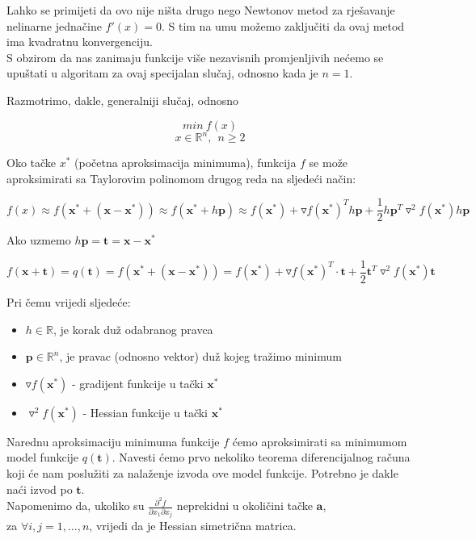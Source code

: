 \documentclass[bosnian,12pt,a4paper]{report}
\begin{document}
	\vspace{1cm}
	Lahko se primijeti da ovo nije ništa drugo nego Newtonov metod za rješavanje nelinarne jednačine $f'(x)=0$. S tim na umu možemo zaključiti da ovaj metod ima kvadratnu konvergenciju. \\ S obzirom da nas zanimaju funkcije više nezavisnih promjenljivih nećemo se upuštati u algoritam za ovaj specijalan slučaj, odnosno kada je $n=1$.
	
	\vspace{1.5cm}
	Razmotrimo, dakle, generalniji slučaj, odnosno
	
	$$min~f(x)$$
	$$x \in \mathbb{R}^n, ~~ n \geq 2$$
	
	\vspace{0.5cm}
	Oko tačke $x^{*}$ (početna aproksimacija minimuma), funkcija $f$ se može aproksimirati sa Taylorovim polinomom drugog reda na sljedeći način:
	
	$$f(x) \approx f(\textbf{x}^* + (\textbf{x} - \textbf{x}^*)) \approx f(\textbf{x}^* + h\textbf{p}) \approx f(\textbf{x}^*) + \triangledown f(\textbf{x}^*)^T h\textbf{p} + \frac{1}{2} h \textbf{p}^T \triangledown^2 f(\textbf{x}^*) h \textbf{p}$$
	
	Ako uzmemo $h\textbf{p} = \textbf{t}  = \textbf{x}-\textbf{x}^*$ 
	
	$$f(\textbf{x} + \textbf{t}) = q(\textbf{t}) = f(\textbf{x}^* + (\textbf{x} - \textbf{x}^*)) = f(\textbf{x}^*) + \triangledown f(\textbf{x}^*)^T \cdot\textbf{t} + \frac{1}{2} \textbf{t}^T \triangledown^2 f(\textbf{x}^*)\textbf{t}$$
	
	\newpage
	Pri čemu vrijedi sljedeće:
	
	\begin{itemize}
		\item $h \in \mathbb{R}$, je korak duž odabranog pravca
		\item $\textbf{p} \in \mathbb{R}^n$, je pravac (odnosno vektor) duž kojeg tražimo minimum
		\item $\triangledown f(\textbf{x}^*)$ - gradijent funkcije u tački $\textbf{x}^*$
		\item $\triangledown^2 f(\textbf{x}^*)$ - Hessian funkcije u tački $\textbf{x}^*$
	\end{itemize}
	
	\vspace{0.5cm}
	
	\justify
	Narednu aproksimaciju minimuma funkcije $f$ ćemo aproksimirati sa minimumom model funkcije $q(\textbf{t})$. Navesti ćemo prvo nekoliko teorema diferencijalnog računa koji će nam poslužiti za nalaženje izvoda ove model funkcije. Potrebno je dakle naći izvod po $\textbf{t}$. \\Napomenimo da, ukoliko su $\frac{\partial^2 f}{\partial x_1 \partial x_j}$ neprekidni u okoličini tačke $\textbf{a}$, \\ za $\forall i,j = 1,...,n$, vrijedi da je Hessian simetrična matrica.
	
\end{document}
